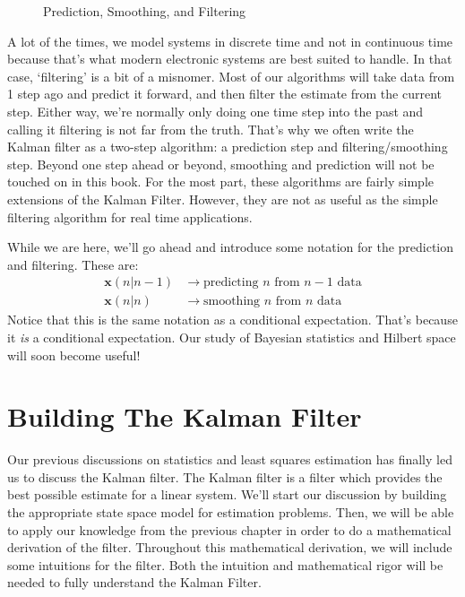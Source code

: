 \begin{figure}[ht]

    
    \caption{Prediction, Smoothing, and Filtering}
    \label{fig:filter smooth}
\end{figure}

A lot of the times, we model systems in discrete time and not in continuous time because that's what modern electronic systems are best suited to handle. In that case, `filtering' is a bit of a misnomer. Most of our algorithms will take data from 1 step ago and predict it forward, and then filter the estimate from the current step. Either way, we're normally only doing one time step into the past and calling it filtering is not far from the truth. That's why we often write the Kalman filter as a two-step algorithm: a prediction step and filtering/smoothing step. Beyond one step ahead or beyond, smoothing and prediction will not be touched on in this book. For the most part, these algorithms are fairly simple extensions of the Kalman Filter. However, they are not as useful as the simple filtering algorithm for real time applications.

While we are here, we'll go ahead and introduce some notation for the prediction and filtering. These are:
\begin{align}
\bm{x}(n|n-1)&\rightarrow\text{predicting $n$ from $n-1$ data} \\
\bm{x}(n|n)&\rightarrow\text{smoothing $n$  from $n$ data}
\end{align}
Notice that this is the same notation as a conditional expectation. That's because it \textit{is} a conditional expectation. Our study of Bayesian statistics and Hilbert space will soon become useful!

\section{Building The Kalman Filter}
Our previous discussions on statistics and least squares estimation has finally led us to discuss the Kalman filter. The Kalman filter is a filter which provides the best possible estimate for a linear system. We'll start our discussion by building the appropriate state space model for estimation problems. Then, we will be able to apply our knowledge from the previous chapter in order to do a mathematical derivation of the filter. Throughout this mathematical derivation, we will include some intuitions for the filter. Both the intuition and mathematical rigor will be needed to fully understand the Kalman Filter. 

